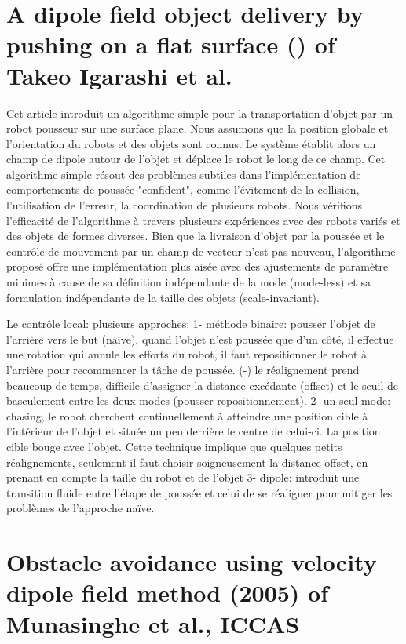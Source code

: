\documentclass[11pt]{report}
\begin{document}
\part{A dipole field object delivery by pushing on a flat surface () of Takeo Igarashi et al.}

Cet article introduit un algorithme simple pour la transportation d'objet par un robot pousseur sur une surface plane. Nous assumons que la position globale et l'orientation du robots et des objets sont connus. Le système établit alors un champ de dipole autour de l'objet et déplace le robot le long de ce champ. Cet algorithme simple résout des problèmes subtiles dans l'implémentation de comportements de poussée "confident", comme l'évitement de la collision, l'utilisation de l'erreur, la coordination de plusieurs robots. Nous vérifions l'efficacité de l'algorithme à travers plusieurs expériences avec des robots variés et des objets de formes diverses. Bien que la livraison d'objet par la poussée et le contrôle de mouvement par un champ de vecteur n'est pas nouveau, l'algorithme proposé offre une implémentation plus aisée avec des ajustements de paramètre minimes à cause de sa définition indépendante de la mode (mode-less) et sa formulation indépendante de la taille des objets (scale-invariant).

Le contrôle local:
plusieurs approches: 
1- méthode binaire: pousser l'objet de l'arrière vers le but (naïve), quand l'objet n'est poussée que d'un côté, il effectue une rotation qui annule les efforts du robot, il faut repositionner le robot à l'arrière pour recommencer la tâche de poussée. (-) le réalignement prend beaucoup de temps, difficile d'assigner la distance excédante (offset) et le seuil de basculement entre les deux modes (pousser-repositionnement).
2- un seul mode: chasing, le robot cherchent continuellement à atteindre une position cible à l'intérieur de l'objet et située un peu derrière le centre de celui-ci. La position cible bouge avec l'objet. Cette technique implique que quelques petits réalignements, seulement il faut choisir soigneusement la distance offset, en prenant en compte la taille du robot et de l'objet
3- dipole: introduit une transition fluide entre l'étape de poussée et celui de se réaligner pour mitiger les problèmes de l'approche naïve.


\part{Obstacle avoidance using velocity dipole field method (2005) of Munasinghe et al., ICCAS}
\end{document}
